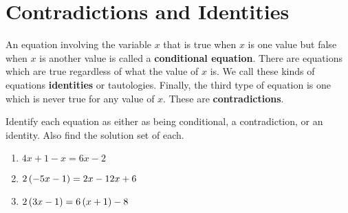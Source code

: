 \section{Contradictions and Identities}
An equation involving the variable \(x\) that is true when \(x\) is one
value but false when \(x\) is another value is called a
\textbf{conditional equation}. There are equations which are true
regardless of what the value of \(x\) is. We call these kinds of 
equations \textbf{identities} or tautologies. Finally, the third type 
of equation is one which is never true for any value of \(x\). These 
are \textbf{contradictions}.

\begin{example}
    Identify each equation as either as being conditional, a 
    contradiction, or an identity. Also find the solution set of each.
    \begin{enumerate}
        \item \(4 x + 1 - x = 6 x - 2\)
        \item \(2\left( -5 x - 1\right) = 2 x - 12 x + 6\)
        \item \(2\left( 3 x - 1\right) = 6\left( x + 1\right) - 8\)
    \end{enumerate}
    

\end{example}
